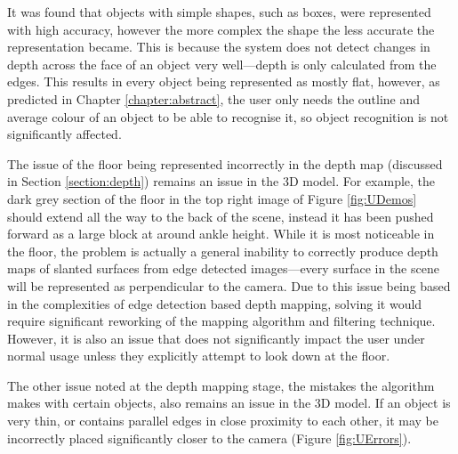 It was found that objects with simple shapes, such as boxes, were represented with high accuracy, however the more complex the shape the less accurate the representation became. This is because the system does not detect changes in depth across the face of an object very well---depth is only calculated from the edges. This results in every object being represented as mostly flat, however, as predicted in Chapter \ref{chapter:abstract}, the user only needs the outline and average colour of an object to be able to recognise it, so object recognition is not significantly affected.

The issue of the floor being represented incorrectly in the depth map (discussed in Section \ref{section:depth}) remains an issue in the 3D model. For example, the dark grey section of the floor in the top right image of Figure \ref{fig:UDemos} should extend all the way to the back of the scene, instead it has been pushed forward as a large block at around ankle height. While it is most noticeable in the floor, the problem is actually a general inability to correctly produce depth maps of slanted surfaces from edge detected images---every surface in the scene will be represented as perpendicular to the camera. Due to this issue being based in the complexities of edge detection based depth mapping, solving it would require significant reworking of the mapping algorithm and filtering technique. However, it is also an issue that does not significantly impact the user under normal usage unless they explicitly attempt to look down at the floor.

The other issue noted at the depth mapping stage, the mistakes the algorithm makes with certain objects, also remains an issue in the 3D model. If an object is very thin, or contains parallel edges in close proximity to each other, it may be incorrectly placed significantly closer to the camera (Figure \ref{fig:UErrors}).

